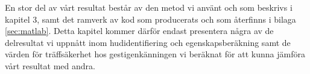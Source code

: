 \documentclass[../rapport_MVEX01-11-05]{subfiles}
\begin{document}
En stor del av vårt resultat består av den metod vi använt och
som beskrivs i kapitel 3, samt
det ramverk av kod som producerats och som återfinns i bilaga 
\ref{sec:matlab}. Detta kapitel kommer därför endast presentera
några av de delresultat vi uppnått inom hudidentifiering och 
egenskapsberäkning samt de värden för träffsäkerhet hos gestigenkänningen
vi beräknat för att kunna jämföra vårt resultat med andra.
\end{document}
